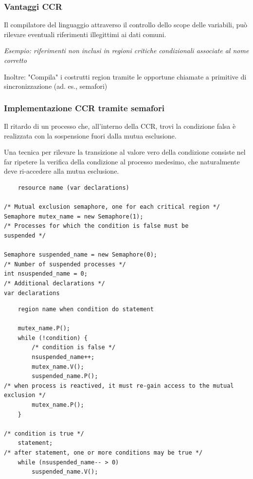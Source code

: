 \subsubsection{Vantaggi CCR}
Il compilatore del linguaggio attraverso il controllo dello scope delle variabili, può rilevare eventuali riferimenti illegittimi ai dati comuni.

\textit{Esempio: riferimenti non inclusi in regioni critiche condizionali associate al nome corretto}

Inoltre: "Compila" i costrutti region tramite le opportune chiamate a primitive di sincronizzazione (ad. es., semafori)

\subsubsection{Implementazione CCR tramite semafori}
Il ritardo di un processo che, all'interno della CCR, trovi la condizione falsa è realizzata con la sospensione fuori dalla mutua esclusione.

Una tecnica per rilevare la transizione al valore vero della condizione consiste nel far ripetere la verifica della condizione al processo medesimo, che naturalmente deve ri-accedere alla mutua esclusione.

\begin{lstlisting}
    resource name (var declarations)

/* Mutual exclusion semaphore, one for each critical region */
Semaphore mutex_name = new Semaphore(1);
/* Processes for which the condition is false must be
suspended */

Semaphore suspended_name = new Semaphore(0);
/* Number of suspended processes */
int nsuspended_name = 0;
/* Additional declarations */
var declarations
\end{lstlisting}

\begin{lstlisting}
    region name when condition do statement

    mutex_name.P();
    while (!condition) {
        /* condition is false */
        nsuspended_name++;
        mutex_name.V();
        suspended_name.P();
/* when process is reactived, it must re-gain access to the mutual exclusion */
        mutex_name.P();
    }

/* condition is true */
    statement;
/* after statement, one or more conditions may be true */
    while (nsuspended_name-- > 0)
        suspended_name.V();
\end{lstlisting}
